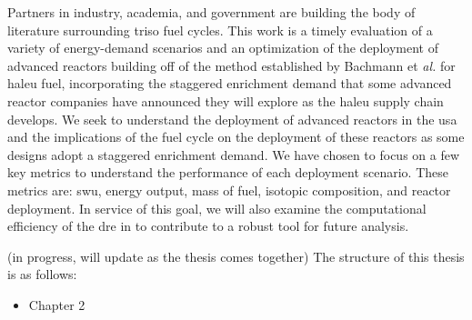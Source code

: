 Partners in industry, academia, and government are building the body of literature surrounding \gls{triso} fuel cycles. This work is a timely evaluation of a variety of energy-demand scenarios and an optimization of the deployment of advanced reactors building off of the method established by Bachmann et \textit{al.} \cite{bachmann_enrichment_2021} for \gls{haleu} fuel, incorporating the staggered enrichment demand that some advanced reactor companies have announced they will explore as the \gls{haleu} supply chain develops. We seek to understand the deployment of advanced reactors in the \gls{usa} and the implications of the fuel cycle on the deployment of these reactors as some designs adopt a staggered enrichment demand. We have chosen to focus on a few key metrics to understand the performance of each deployment scenario. These metrics are: \gls{swu}, energy output, mass of fuel, isotopic composition, and reactor deployment. In service of this goal, we will also examine the computational efficiency of the \gls{dre} in \cyclus to contribute to a robust tool for future analysis.


\pagebreak

(in progress, will update as the thesis comes together)
The structure of this thesis is as follows:

\begin{itemize}
    \item Chapter 2
\end{itemize}
